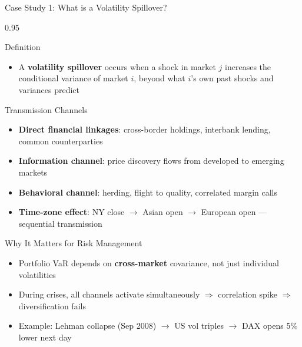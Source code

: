 \documentclass[9pt, aspectratio=169, t]{beamer}
\begin{document}
\begin{frame}{Case Study 1: What is a Volatility Spillover?}
    \begin{cminipage}{0.95\textwidth}
    {\footnotesize
    \begin{block}{Definition}
        \begin{itemize}\setlength{\itemsep}{0pt}
            \item A \textbf{volatility spillover} occurs when a shock in market $j$ increases the conditional variance of market $i$, beyond what $i$'s own past shocks and variances predict
        \end{itemize}
    \end{block}
    \vspace{-2mm}
    \begin{block}{Transmission Channels}
        \begin{itemize}\setlength{\itemsep}{0pt}
            \item \textbf{Direct financial linkages}: cross-border holdings, interbank lending, common counterparties
            \item \textbf{Information channel}: price discovery flows from developed to emerging markets
            \item \textbf{Behavioral channel}: herding, flight to quality, correlated margin calls
            \item \textbf{Time-zone effect}: NY close $\rightarrow$ Asian open $\rightarrow$ European open --- sequential transmission
        \end{itemize}
    \end{block}
    \vspace{-2mm}
    \begin{alertblock}{Why It Matters for Risk Management}
        \begin{itemize}\setlength{\itemsep}{0pt}
            \item Portfolio VaR depends on \textbf{cross-market} covariance, not just individual volatilities
            \item During crises, all channels activate simultaneously $\Rightarrow$ correlation spike $\Rightarrow$ diversification fails
            \item Example: Lehman collapse (Sep 2008) $\rightarrow$ US vol triples $\rightarrow$ DAX opens 5\% lower next day
        \end{itemize}
    \end{alertblock}
    }
    \end{cminipage}
\end{frame}
\end{document}
